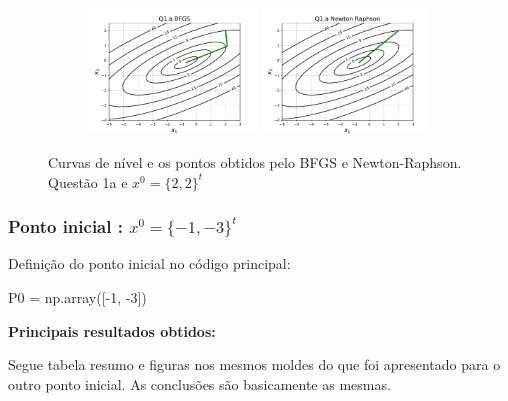 \documentclass[10pt, a4paper]{article}
\begin{document}
\begin{figure}[H]
  \centering
  \begin{subfigure}[b]{\textwidth}
    \includegraphics[width=0.49\textwidth]{figuras/Q1.a_BFGS_P0=[2 2].pdf}
    \includegraphics[width=0.49\textwidth]{figuras/Q1.a_Newton Raphson_P0=[2 2].pdf}
  \end{subfigure}
  \caption{Curvas de nível e os pontos obtidos pelo BFGS e Newton-Raphson. Questão 1a e $x^0 = \{2,2\}^t$}
\end{figure}

\subsubsection{Ponto inicial : $x^0 = \{-1,-3\}^t$}
Definição do ponto inicial no código principal:
\begin{python}
  P0 = np.array([-1, -3])
\end{python}

\vspace{3mm}
\textbf{Principais resultados obtidos:}

\vspace{3mm}
Segue tabela resumo e figuras nos mesmos moldes do que foi apresentado para o outro ponto inicial.
As conclusões são basicamente as mesmas.
\end{document}
